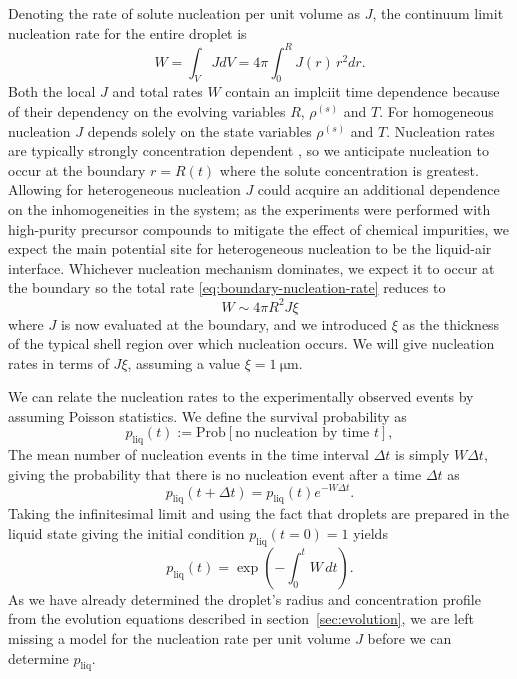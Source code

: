 \documentclass[11pt,twoside]{report}
\begin{document}
Denoting the rate of solute nucleation per unit volume as $J$, the continuum limit nucleation rate for the entire droplet is
\begin{equation}\label{eq:droplet-nucleation-rate}
  W
  =
  \int_V J dV
  =
  4\pi \int_0^R J(r) \, r^2 dr.
\end{equation}
Both the local $J$ and total rates $W$ contain an implciit time dependence because of their dependency on the evolving variables $R$, $\rho^{(s)}$ and $T$.
For homogeneous nucleation $J$ depends solely on the state variables $\rho^{(s)}$ and $T$.
Nucleation rates are typically strongly concentration dependent \cite{ValerianiJCP2005,DesarnaudJPCL2014,SearJPCM2007}, so we anticipate nucleation to occur at the boundary $r=R(t)$ where the solute concentration is greatest.
Allowing for heterogeneous nucleation $J$ could acquire an additional dependence on the inhomogeneities in the system; as the experiments were performed with high-purity precursor compounds to mitigate the effect of chemical impurities, we expect the main potential site for heterogeneous nucleation to be the liquid-air interface.
Whichever nucleation mechanism dominates, we expect it to occur at the boundary so the total rate \eqref{eq:boundary-nucleation-rate} reduces to
\begin{equation}\label{eq:boundary-nucleation-rate}
  W
  \sim
  4\pi R^2 J \xi
\end{equation}
where $J$ is now evaluated at the boundary, and we introduced $\xi$ as the thickness of the typical shell region over which nucleation occurs.
We will give nucleation rates in terms of $J \xi$, assuming a value $\xi = \SI{1}{\micro\metre}$.

We can relate the nucleation rates to the experimentally observed events by assuming Poisson statistics.
We define the survival probability as
\begin{equation*}
  p_\mathrm{liq}(t)
  :=
  \textrm{Prob}\left[ \textrm{no nucleation by time } t \right],
\end{equation*}
The mean number of nucleation events in the time interval $\Delta t$ is simply $W \Delta t$, giving the probability that there is no nucleation event after a time $\Delta t$ as
\begin{equation*}
  p_\mathrm{liq}(t + \Delta t) = p_\mathrm{liq}(t) e^{-W \Delta t}.
\end{equation*}
Taking the infinitesimal limit and using the fact that droplets are prepared in the liquid state giving the initial condition $p_\mathrm{liq}(t=0) = 1$ yields
\begin{equation}\label{eq:survival}
  p_\mathrm{liq}(t)
  =
  \exp{\left( -\int_0^t W \, dt \right)}.
\end{equation}
As we have already determined the droplet's radius and concentration profile from the evolution equations described in section\ \ref{sec:evolution}, we are left missing a model for the nucleation rate per unit volume $J$ before we can determine $p_\mathrm{liq}$.
\end{document}
